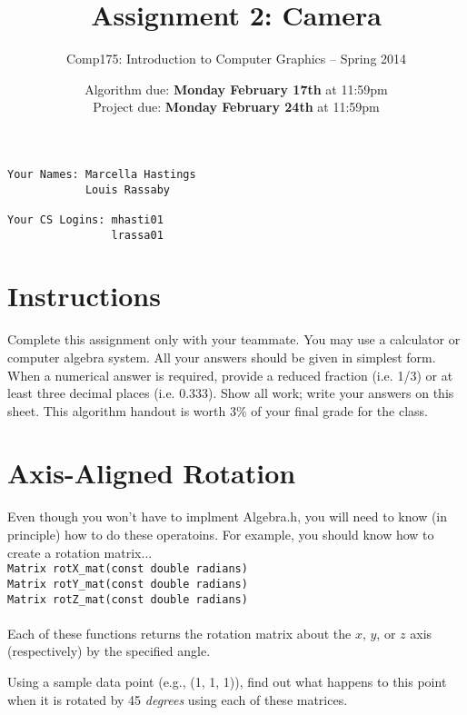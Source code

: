 \documentclass[10pt,twocolumn]{article}
\title{\Huge{\bf Assignment 2: Camera}}
\author{Comp175: Introduction to Computer Graphics -- Spring 2014}
\date{Algorithm due:  {\bf Monday February 17th} at 11:59pm\\
Project due:  {\bf Monday February 24th} at 11:59pm}
\begin{document}
\maketitle

\begin{verbatim}
Your Names: Marcella Hastings
            Louis Rassaby

Your CS Logins: mhasti01
                lrassa01
\end{verbatim}

\section{Instructions}
Complete this assignment only with your teammate. You may use a
calculator or computer algebra system. All your answers should be given in simplest form.
When a numerical answer is required, provide a reduced fraction (i.e. 1/3) or at least three
decimal places (i.e. 0.333). Show all work; write your answers on this sheet. This algorithm handout is worth 3\% of your final grade for the class.

\vspace{-0.4cm}
\section{Axis-Aligned Rotation}

Even though you won't have to implment Algebra.h, you will need to know (in principle) how to do these operatoins. For example, you should know how to create a rotation matrix...\\
{\tt Matrix rotX\_mat(const double radians)}\\
{\tt Matrix rotY\_mat(const double radians)}\\
{\tt Matrix rotZ\_mat(const double radians)}\\\\
Each of these functions returns the rotation matrix about the $x$, $y$, or $z$ axis (respectively) by the specified angle.
\begin{framed}
\noindent {\bf [1 point]} Using a sample data point (e.g., (1, 1, 1)), find out what happens to this point when it is rotated by 45 \emph{degrees} using each of these matrices.
\end{framed}
\end{document}
